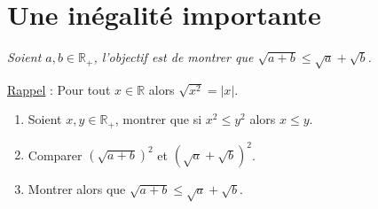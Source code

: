 \documentclass[french]{book}
\begin{document}
\section*{Une inégalité importante}
\begin{center}

\textit{Soient $a,b \in \mathbb{R}_+$, l'objectif est de montrer que $\sqrt{a+b} \leq \sqrt{a}+\sqrt{b}$.}

\end{center}

\underline{Rappel} : Pour tout $x \in \mathbb{R}$ alors $\sqrt{x^2}=\vert x \vert$.

\begin{enumerate}
\item Soient $x,y \in \mathbb{R}_+$, montrer que si $x^2 \leq y^2$ alors $x \leq y$.
\item Comparer $(\sqrt{a+b})^2$ et $(\sqrt{a}+\sqrt{b})^2$.
\item Montrer alors que $\sqrt{a+b} \leq \sqrt{a}+\sqrt{b}$.
\end{enumerate}
\end{document}
